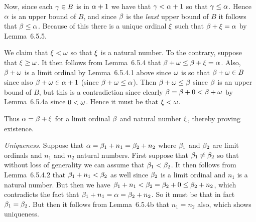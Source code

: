 \begin{solution}
    Now, since each $\gamma \in B$ is in $\alpha+1$ we have that $\gamma < \alpha+1$ so that $\gamma \leq \alpha$.
    Hence $\alpha$ is an upper bound of $B$, and since $\beta$ is the \emph{least} upper bound of $B$ it follows that $\beta \leq \alpha$.
    Because of this there is a unique ordinal $\xi$ such that $\beta + \xi = \alpha$ by Lemma~6.5.5.

    We claim that $\xi < \omega$ so that $\xi$ is a natural number.
    To the contrary, suppose that $\xi \geq \omega$.
    It then follows from Lemma~6.5.4 that  $\beta + \omega \leq \beta + \xi = \alpha$.
    Also, $\beta + \omega$ is a limit ordinal by Lemma~6.5.4.1 above since $\omega$ is so that $\beta+\omega \in B$ since also $\beta + \omega \in \alpha+1$ (since $\beta+\omega \leq \alpha$).
    Then $\beta + \omega \leq \beta$ since $\beta$ is an upper bound of $B$, but this is a contradiction since clearly $\beta = \beta + 0 < \beta + \omega$ by Lemma~6.5.4a since $0 < \omega$.
    Hence it must be that $\xi < \omega$.

    Thus $\alpha = \beta + \xi$ for a limit ordinal $\beta$ and natural number $\xi$, thereby proving existence.

    \emph{Uniqueness.}
    Suppose that $\alpha = \beta_1 + n_1 = \beta_2 + n_2$ where $\beta_1$ and $\beta_2$ are limit ordinals and $n_1$ and $n_2$ natural numbers.
    First suppose that $\beta_1 \neq \beta_2$ so that without loss of generality we can assume that $\beta_1 < \beta_2$.
    It then follows from Lemma~6.5.4.2 that $\beta_1 + n_1 < \beta_2$ as well since $\beta_2$ is a limit ordinal and $n_1$ is a natural number.
    But then we have $\beta_1 + n_1 < \beta_2 = \beta_2 + 0 \leq \beta_2 + n_2$, which contradicts the fact that $\beta_1 + n_1 = \alpha = \beta_2 + n_2$.
    So it must be that in fact $\beta_1 = \beta_2$.
    But then it follows from Lemma~6.5.4b that $n_1 = n_2$ also, which shows uniqueness. \qedsymbol
\end{solution}



